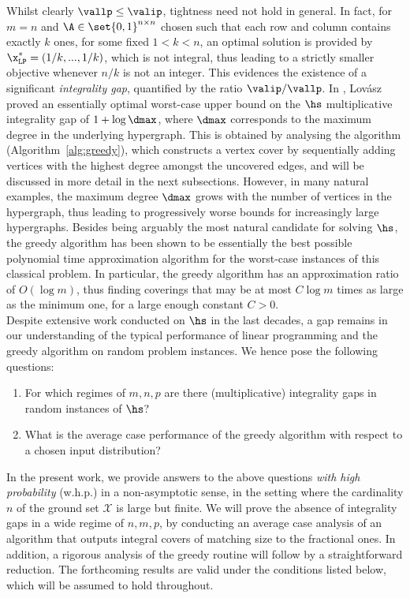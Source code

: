 Whilst clearly $\vallp\leq \valip$, tightness need not hold in general. In fact, for $m = n$ and $\A \in \set{0,1}^{n\times n}$ chosen such that each row and column contains exactly $k$ ones, for some fixed $1 < k < n$, an optimal solution is provided by $\x^*_{\texttt{LP}}=\left(1/k,...,1/k\right)$, which is not integral, thus leading to a strictly smaller objective whenever $n / k$ is not an integer. This evidences the existence of a significant \emph{integrality gap}, quantified by the ratio \(\valip / \vallp\). In \cite{lovasz1975ratio}, Lovász proved an essentially optimal worst-case upper bound on the $\hs$ multiplicative integrality gap of $1+\log \dmax$, where $\dmax$ corresponds to the maximum degree in the underlying hypergraph. 
This is obtained by analysing the \greedy algorithm (Algorithm~\ref{alg:greedy}), which constructs a vertex cover by sequentially adding vertices with the highest degree amongst the uncovered edges, and will be discussed in more detail in the next subsections. However, in many natural examples, the maximum degree $\dmax$ grows with the number of vertices in the hypergraph, thus leading to progressively worse bounds for increasingly large hypergraphs. Besides being arguably the most natural candidate for solving $\hs$, the greedy algorithm has been shown to be essentially the best possible polynomial time approximation algorithm \cite{slavik1996tight} for the worst-case instances of this classical problem. In particular, the greedy algorithm has an approximation ratio of $O(\log m)$, thus finding coverings that may be at most $C\log m$ times as large as the minimum one, for a large enough constant $C > 0$. \\
\noindent 
Despite extensive work conducted on $\hs$ in the last decades, a gap remains in our understanding of the typical performance of linear programming and the greedy algorithm on random problem instances. We hence pose the following questions:
\begin{enumerate}
    \item For which regimes of $m,n,p$ are there (multiplicative) integrality gaps in random instances of $\hs$?
    \item What is the average case performance of the greedy algorithm with respect to a chosen input distribution? 
\end{enumerate}
In the present work, we provide answers to the above questions 
\emph{with high probability} (w.h.p.) in a non-asymptotic sense, 
in the setting where the cardinality $n$ of the ground set $\mathcal{X}$ 
is large but finite. We will prove the absence of integrality gaps in a wide regime of $n,m,p$, by conducting an average case analysis of an algorithm that outputs integral covers of matching size to the fractional ones. In addition, a rigorous analysis of the greedy routine will follow by a straightforward reduction. The forthcoming results are valid under the conditions listed below, which will be assumed to hold throughout.
